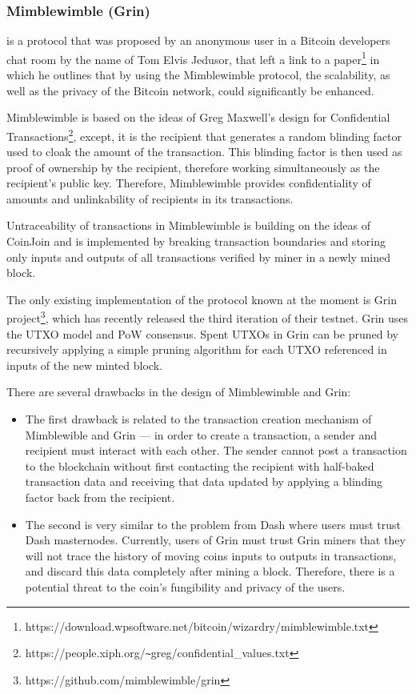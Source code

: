 \documentclass[a4paper, 10pt, conference]{ieeeconf}
\begin{document}
\subsubsection{Mimblewimble (Grin)} is a protocol that was proposed by an anonymous user in a Bitcoin developers chat room by the name of Tom Elvis Jedusor, that left a link to a paper\footnote{https://download.wpsoftware.net/bitcoin/wizardry/mimblewimble.txt} in which he outlines that by using the Mimblewimble protocol, the scalability, as well as the privacy of the Bitcoin network, could significantly be enhanced.

Mimblewimble is based on the ideas of Greg Maxwell's design for Confidential Transactions\footnote{https://people.xiph.org/\texttt{\~{}}greg/confidential\_values.txt}, except, it is the recipient that generates a random blinding factor used to cloak the amount of the transaction. This blinding factor is then used as proof of ownership by the recipient, therefore working simultaneously as the recipient's public key. Therefore, Mimblewimble provides confidentiality of amounts and unlinkability of recipients in its transactions.

Untraceability of transactions in Mimblewimble is building on the ideas of CoinJoin and is implemented by breaking transaction boundaries and storing only inputs and outputs of all transactions verified by miner in a newly mined block.

The only existing implementation of the protocol known at the moment is Grin project\footnote{https://github.com/mimblewimble/grin}, which has recently released the third iteration of their testnet. Grin uses the UTXO model and PoW consensus. Spent UTXOs in Grin can be pruned by recursively applying a simple pruning algorithm for each UTXO referenced in inputs of the new minted block.

There are several drawbacks in the design of Mimblewimble and Grin:

\begin{itemize}
	\item {The first drawback is related to the transaction creation mechanism of Mimblewible and Grin --- in order to create a transaction, a sender and recipient must interact with each other. The sender cannot post a transaction to the blockchain without first contacting the recipient with half-baked transaction data and receiving that data updated by applying a blinding factor back from the recipient.}
	\item {The second is very similar to the problem from Dash where users must trust Dash masternodes. Currently, users of Grin must trust Grin miners that they will not trace the history of moving coins inputs to outputs in transactions, and discard this data completely after mining a block. Therefore, there is a potential threat to the coin's fungibility and privacy of the users.}
\end{itemize}
\end{document}
